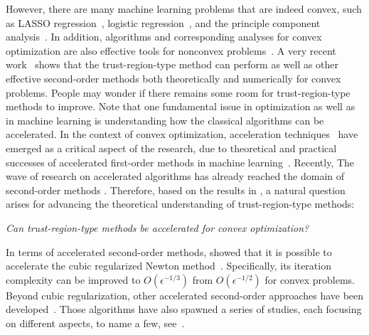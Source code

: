 \documentclass{article}
\theoremstyle{plain}
\theoremstyle{definition}
\theoremstyle{remark}
\begin{document}
However, there are many machine learning problems that are indeed convex, such as LASSO regression~\cite{ranstam2018lasso}, logistic regression~\citet{lavalley2008logistic}, and the principle component analysis~\cite{abdi2010principal}. In addition, algorithms and corresponding analyses for convex optimization are also effective tools for nonconvex problems~\cite{carmon2017convex,carmon2018accelerated,li2023restarted}. A very recent work~\cite{jiang2024nonconvexityuniversaltrustregionmethod} shows that the trust-region-type method can perform as well as other effective second-order methods both theoretically and numerically for convex problems. People may wonder if there remains some room for trust-region-type methods to improve.
Note that one fundamental issue in optimization as well as in machine learning is understanding how the classical algorithms can be accelerated. In the context of convex optimization, acceleration techniques~\cite{nesterovMethodSolvingConvex1983a,nesterov_lectures_2018} have emerged as a critical aspect of the research, due to theoretical and practical successes of accelerated first-order methods in machine learning~\cite{lan_first-order_2020,lin2020accelerated}. Recently, The wave of research on accelerated algorithms has already reached the domain of second-order methods \cite{nesterov2008accelerating, monteiro2013accelerated,doikov2020contracting,carmon2022optimal,NEURIPS2022_e56f394b}.
Therefore, based on the results in \citet{jiang2024nonconvexityuniversaltrustregionmethod}, a natural question arises for advancing the theoretical understanding of trust-region-type methods:
\begin{center}
    \emph{Can trust-region-type methods be accelerated for convex optimization?}
\end{center}
In terms of accelerated second-order methods, \citet{nesterov2008accelerating} showed that it is possible to accelerate the cubic regularized Newton method~\cite{nesterov2006cubic}. Specifically, its iteration complexity can be improved to $O(\epsilon^{-1/3})$ from $O(\epsilon^{-1/2})$ for convex problems. Beyond cubic regularization, other accelerated second-order approaches have been developed~\cite{monteiro2013accelerated,doikov2020contracting,carmon2022optimal,NEURIPS2022_e56f394b}. Those algorithms have also spawned a series of studies, each focusing on different aspects, to name a few, see~\citet{jiang2020unified,jiang2021optimal,chen2022accelerating,lin2022explicit,agafonov2023inexact,agafonov2024advancing,jiang2024accelerated,huang2024inexact}.
\end{document}
